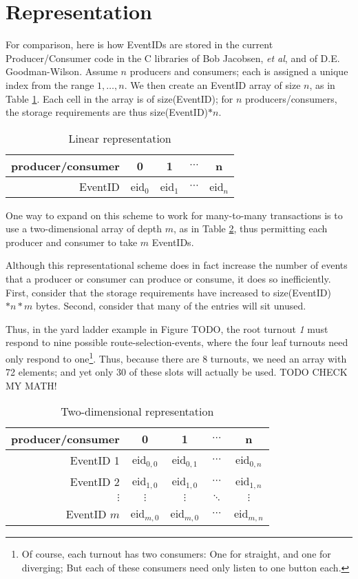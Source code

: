\documentclass[11pt]{article}
\begin{document}
\section{Representation}

For comparison, here is how EventIDs are stored in the current Producer/Consumer code in the C libraries of Bob Jacobsen, \textit{et al}, and of D.E. Goodman-Wilson. Assume $n$ producers and consumers; each is assigned a unique index from the range ${1,\ldots,n}$. We then create an EventID array of size $n$, as in Table \ref{linear}. Each cell in the array is of size(EventID); for $n$ producers/consumers, the storage requirements are thus size(EventID)$*n$.
\begin{table}[htdp]
\caption{Linear representation}
\begin{center}
\begin{tabular}{r|c|c|c|c|}
producer/consumer&0&1&$\cdots$&n \\ \hline
EventID&eid$_0$ & eid$_1$ & $\cdots$ &eid$_{n}$\\
\end{tabular}
\end{center}
\label{linear}
\end{table}%

One way to expand on this scheme to work for many-to-many transactions is to use a two-dimensional array of depth $m$, as in Table \ref{two-dim}, thus permitting each producer and consumer to take $m$ EventIDs.

Although this representational scheme does in fact increase the number of events that a producer or consumer can produce or consume, it does so inefficiently. First, consider that the storage requirements have increased to size(EventID)$*n*m$ bytes. Second, consider that many of the entries will sit unused.

Thus, in the yard ladder example in Figure TODO, the root turnout \textit{1} must respond to nine possible route-selection-events, where the four leaf turnouts need only respond to one\footnote{Of course, each turnout has two consumers: One for straight, and one for diverging; But each of these consumers need only listen to one button each.}. Thus, because there are 8 turnouts, we need an array with 72 elements; and yet only 30 of these slots will actually be used. TODO CHECK MY MATH!

\begin{table}[htdp]
\caption{Two-dimensional representation}
\begin{center}
\begin{tabular}{r|c|c|c|c|}
producer/consumer&0&1&$\cdots$&n \\ \hline
EventID 1&eid$_{0,0}$ & eid$_{0,1}$ & $\cdots$ &eid$_{0,n}$\\
EventID 2&eid$_{1,0}$ & eid$_{1,0}$ & $\cdots$ &eid$_{1,n}$\\
$\vdots$ & $\vdots$ & $\vdots$ & $\ddots$ & $\vdots$\\
EventID $m$ & eid$_{m,0}$ & eid$_{m,0}$ & $\cdots$ &eid$_{m,n}$\\
\end{tabular}
\end{center}
\label{two-dim}
\end{table}%
\end{document}
